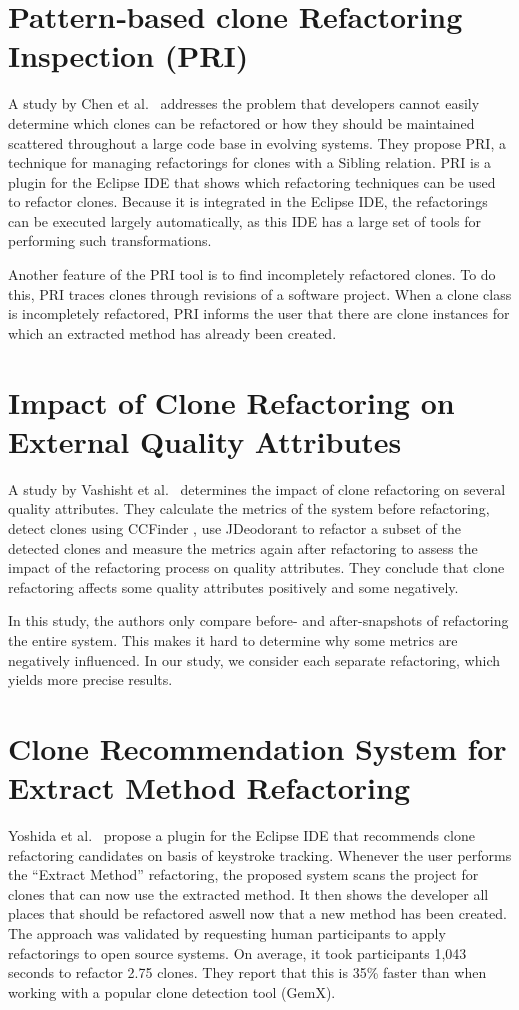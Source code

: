 \section{Pattern‐based clone Refactoring Inspection (PRI)}
A study by Chen et al.~\cite{chen2018clone} addresses the problem that developers cannot easily determine which clones can be refactored or how they should be maintained scattered throughout a large code base in evolving systems. They propose PRI, a technique for managing refactorings for clones with a Sibling relation. PRI is a plugin for the Eclipse IDE that shows which refactoring techniques can be used to refactor clones. Because it is integrated in the Eclipse IDE, the refactorings can be executed largely automatically, as this IDE has a large set of tools for performing such transformations.

Another feature of the PRI tool is to find incompletely refactored clones. To do this, PRI traces clones through revisions of a software project. When a clone class is incompletely refactored, PRI informs the user that there are clone instances for which an extracted method has already been created.

\section{Impact of Clone Refactoring on External Quality Attributes}
A study by Vashisht et al.~\cite{vashisht2018impact} determines the impact of clone refactoring on several quality attributes. They calculate the metrics of the system before refactoring, detect clones using CCFinder \cite{kamiya2002ccfinder}, use JDeodorant to refactor a subset of the detected clones \cite{mazinanian2016jdeodorant} and measure the metrics again after refactoring to assess the impact of the refactoring process on quality attributes. They conclude that clone refactoring affects some quality attributes positively and some negatively.

In this study, the authors only compare before- and after-snapshots of refactoring the entire system. This makes it hard to determine why some metrics are negatively influenced. In our study, we consider each separate refactoring, which yields more precise results.

\section{Clone Recommendation System for Extract Method Refactoring}
Yoshida et al.~\cite{yoshida2019proactive} propose a plugin for the Eclipse IDE that recommends clone refactoring candidates on basis of keystroke tracking. Whenever the user performs the ``Extract Method'' refactoring, the proposed system scans the project for clones that can now use the extracted method. It then shows the developer all places that should be refactored aswell now that a new method has been created. The approach was validated by requesting human participants to apply refactorings to open source systems. On average, it took participants 1,043 seconds to refactor 2.75 clones. They report that this is 35\% faster than when working with a popular clone detection tool (GemX).

